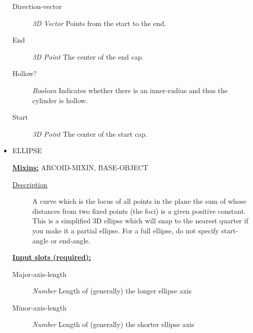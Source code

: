 \documentclass [11pt]{book}
\begin{document}
\begin{itemize}
\begin{description}
\item [Direction-vector]
\emph{3D Vector} Points from the start to the end.


\item [End]
\emph{3D Point} The center of the end cap.


\item [Hollow?]
\emph{Boolean} Indicates whether there is an inner-radius and thus the cylinder is hollow.


\item [Start]
\emph{3D Point} The center of the start cap.


\end{description}







\item {}ELLIPSE


\textbf{
\underline{Mixins:}} ARCOID-MIXIN, BASE-OBJECT





\begin{description}

\item [
\underline{Description}]


A curve which is the locus of all points in the plane 
the sum of whose distances from two fixed points (the foci) is a given positive constant.
This is a simplified 3D ellipse which will snap to the nearest quarter if you make it a 
partial ellipse. For a full ellipse, do not specify start-angle or end-angle.



\end{description}








\textbf{
\underline{Input slots (required):}}

\begin{description}

\item [Major-axis-length]
\emph{Number} Length of (generally) the longer ellipse axis


\item [Minor-axis-length]
\emph{Number} Length of (generally) the shorter ellipse axis



\end{description}
\end{itemize}
\end{document}
